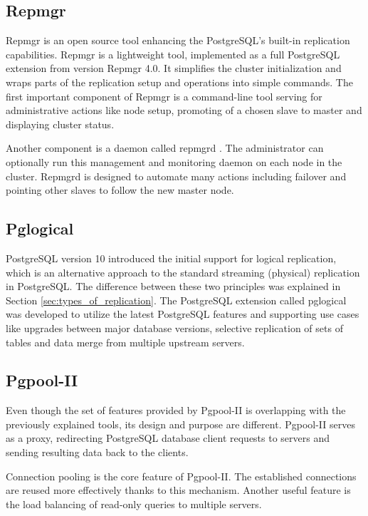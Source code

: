 \documentclass[
  digital, %
  twoside, %
  table,   %
  lof,     %
  lot,     %
]{fithesis3}
\begin{document}
\subsection{Repmgr} \label{sec:repmgr}
Repmgr \cite{repmgr} is an open source tool enhancing the PostgreSQL's built-in replication capabilities. Repmgr is a lightweight tool, implemented as a full PostgreSQL extension from version Repmgr 4.0. It simplifies the cluster initialization and wraps parts of the replication setup and operations into simple commands.
The first important component of Repmgr is a command-line tool serving for administrative actions like node setup, promoting of a chosen slave to master and displaying cluster status.

Another component is a daemon called repmgrd \cite{repmgrd}. The administrator can optionally run this management and monitoring daemon on each node in the cluster. Repmgrd is designed to automate many actions including failover and pointing other slaves to follow the new master node.

\subsection{Pglogical}
PostgreSQL version 10 introduced the initial support for logical replication, which is an alternative approach to the standard streaming (physical) replication in PostgreSQL. The difference between these two principles was explained in Section \ref{sec:types_of_replication}. The PostgreSQL extension called pglogical \cite{pglogical} was developed to utilize the latest PostgreSQL features and supporting use cases like upgrades between major database versions, selective replication of sets of tables and data merge from multiple upstream servers.

\subsection{Pgpool-II} \label{sec:pgpool}
Even though the set of features provided by Pgpool-II \cite{pgpool} is overlapping with the previously explained tools, its design and purpose are different. Pgpool-II serves as a proxy, redirecting PostgreSQL database client requests to servers and sending resulting data back to the clients.

Connection pooling is the core feature of Pgpool-II. The established connections are reused more effectively thanks to this mechanism. Another useful feature is the load balancing of read-only queries to multiple servers.
\end{document}

